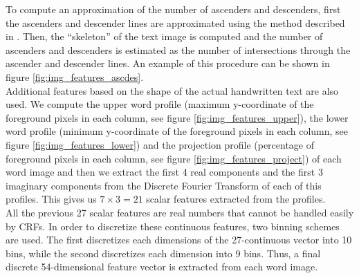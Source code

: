 \documentclass[10pt,a4paper]{article}
\begin{document}
To compute an approximation of the number of ascenders and descenders, first the ascenders and descender lines are approximated using the method described in \cite{gadea2007aportaciones}. Then, the ``skeleton'' of the text image is computed and the number of ascenders and descenders is estimated as the number of intersections through the ascender and descender lines. An example of this procedure can be shown in figure \ref{fig:img_features_ascdes}.\\

Additional features based on the shape of the actual handwritten text are also used. We compute the upper word profile (maximum y-coordinate of the foreground pixels in each column, see figure \ref{fig:img_features_upper}), the lower word profile (minimum y-coordinate of the foreground pixels in each column, see figure \ref{fig:img_features_lower}) and the projection profile (percentage of foreground pixels in each column, see figure \ref{fig:img_features_project}) of each word image and then we extract the first 4 real components and the first 3 imaginary components from the Discrete Fourier Transform of each of this profiles. This gives us $7 \times 3 = 21$ scalar features extracted from the profiles.\\

All the previous 27 scalar features are real numbers that cannot be handled easily by CRFs. In order to discretize these continuous features, two binning schemes are used. The first discretizes each dimensions of the 27-continuous vector into 10 bins, while the second discretizes each dimension into 9 bins. Thus, a final discrete 54-dimensional feature vector is extracted from each word image.\\
\end{document}
